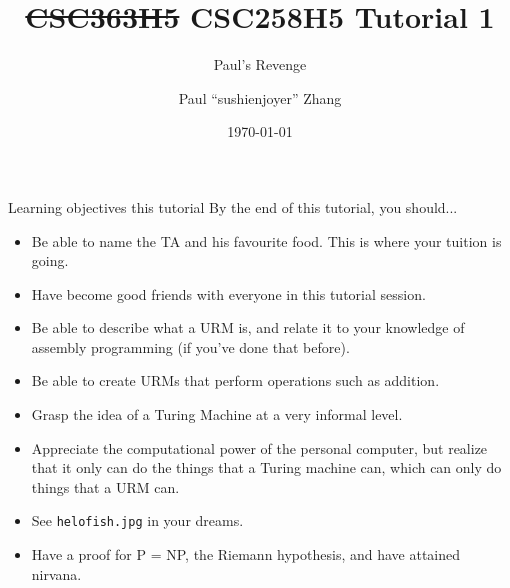 \documentclass{beamer}
\title{\sout{CSC363H5} CSC258H5 Tutorial 1}
\subtitle{Paul's Revenge}
\date{\today}
\author{Paul ``sushi{\textunderscore}enjoyer'' Zhang}
\institute{University of Chungi}
\begin{document}
\maketitle

\begin{frame}{Learning objectives this tutorial}
By the end of this tutorial, you should...
\begin{itemize}
\item Be able to name the TA and his favourite food. This is where your tuition is going.
\item Have become good friends with everyone in this tutorial session.
\item Be able to describe what a URM is, and relate it to your knowledge of assembly programming (if you've done that before).
\item Be able to create URMs that perform operations such as addition.
\item Grasp the idea of a Turing Machine at a very informal level.
\item Appreciate the computational power of the personal computer, but realize that it only can do the things that a Turing machine can, which can only do things that a URM can.
\item See \texttt{helo{\textunderscore}fish.jpg} in your dreams.
\item Have a proof for P = NP, the Riemann hypothesis, and have attained nirvana. 
\end{itemize}
\end{frame}
\end{document}
